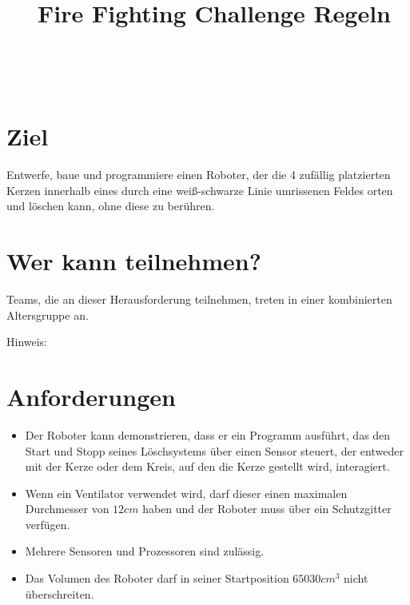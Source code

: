 \documentclass[a4paper,12pt]{article}
\begin{document}



\title{\tagYear\ Fire Fighting Challenge Regeln}

\makeatletter
\let\inserttitle\@title
\makeatother
\begin{center}
	\rrgerLogo
	\huge                      %
	\bfseries                   %
	\\
	\inserttitle
\end{center}

\section{Ziel}
Entwerfe, baue und programmiere einen Roboter, der die 4 zufällig platzierten
Kerzen innerhalb eines durch eine weiß-schwarze Linie umrissenen Feldes orten
und löschen kann, ohne diese zu berühren.

\section{Wer kann teilnehmen?}
Teams, die an dieser Herausforderung teilnehmen, treten in einer kombinierten
Altersgruppe an.

Hinweis: \declareExhibition

\section{Anforderungen}
\robotRequirements
\begin{itemize}
	\item Der Roboter kann demonstrieren, dass er ein Programm ausführt,
		das den Start und Stopp seines Löschsystems über einen Sensor
		steuert, der entweder mit der Kerze oder dem Kreis, auf den die
		Kerze gestellt wird, interagiert.
	\item Wenn ein Ventilator verwendet wird, darf dieser einen maximalen
		Durchmesser von $12 cm$ haben und der Roboter muss über ein
		Schutzgitter verfügen.
	\item Mehrere Sensoren und Prozessoren sind zulässig.
	\item Das Volumen des Roboter darf in seiner Startposition $65030
		cm^{3}$ nicht überschreiten.
\end{itemize}
\end{document}
